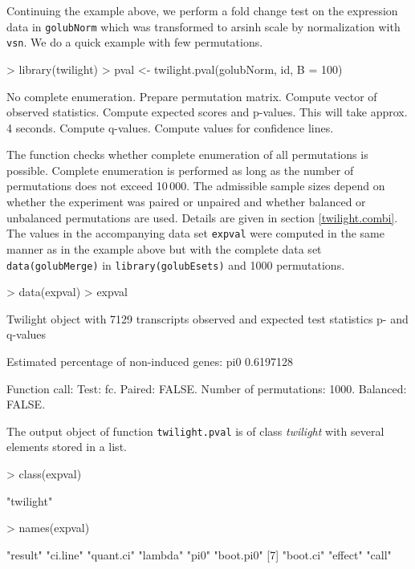 \documentclass[11pt,a4paper,fleqn]{report}
\newcommand{\Robject}[1]{{\texttt{#1}}}
\newcommand{\Rfunction}[1]{{\texttt{#1}}}
\newcommand{\Rclass}[1]{{\textit{#1}}}
\begin{document}
Continuing the example above, we perform a fold change test on the expression data in \Robject{golubNorm} which was transformed to arsinh scale by normalization with \Rfunction{vsn}. We do a quick example with few permutations.
\begin{Schunk}
\begin{Sinput}
> library(twilight)
> pval <- twilight.pval(golubNorm, id, B = 100)
\end{Sinput}
\begin{Soutput}
No complete enumeration. Prepare permutation matrix. 
Compute vector of observed statistics. 
Compute expected scores and p-values. This will take approx. 4 seconds. 
Compute q-values. 
Compute values for confidence lines. 
\end{Soutput}
\end{Schunk}

The function checks whether complete enumeration of all permutations is possible. Complete enumeration is performed as long as the number of permutations does not exceed 10\,000. The admissible sample sizes depend on whether the experiment was paired or unpaired and whether balanced or unbalanced permutations are used. Details are given in section \ref{twilight.combi}.
The values in the accompanying data set \Robject{expval} were computed in the same manner as in the example above but with the complete data set \Rfunction{data(golubMerge)} in \Rfunction{library(golubEsets)} and 1000 permutations.
\begin{Schunk}
\begin{Sinput}
> data(expval)
> expval
\end{Sinput}
\begin{Soutput}
 Twilight object with
     7129 transcripts
     observed and expected test statistics
     p- and q-values

 Estimated percentage of non-induced genes:
      pi0 
0.6197128 

 Function call:
 Test: fc. Paired: FALSE. Number of permutations: 1000. Balanced: FALSE. 
\end{Soutput}
\end{Schunk}

The output object of function \Rfunction{twilight.pval} is of class \Rclass{twilight} with several elements stored in a list.
\begin{Schunk}
\begin{Sinput}
> class(expval)
\end{Sinput}
\begin{Soutput}
[1] "twilight"
\end{Soutput}
\begin{Sinput}
> names(expval)
\end{Sinput}
\begin{Soutput}
[1] "result"   "ci.line"  "quant.ci" "lambda"   "pi0"      "boot.pi0"
[7] "boot.ci"  "effect"   "call"    
\end{Soutput}
\end{Schunk}
\end{document}
